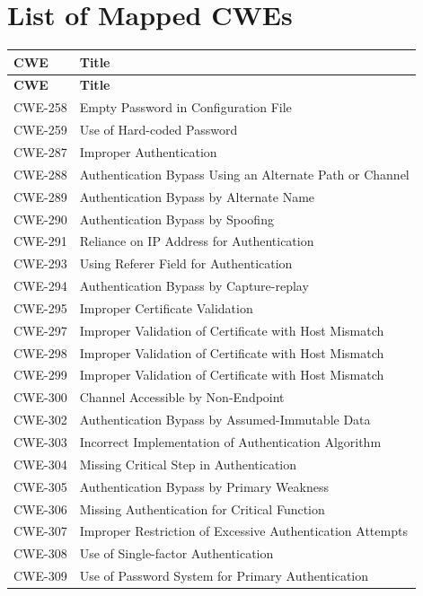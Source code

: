 \documentclass[11pt]{article}
\begin{document}
\section{List of Mapped CWEs}
\renewcommand{\arraystretch}{1.1}
\begin{longtable}{@{}p{2.4cm}p{12.0cm}@{}}
\toprule
\textbf{CWE} & \textbf{Title} \\
\midrule
\endfirsthead
\toprule
\textbf{CWE} & \textbf{Title} \\
\midrule
\endhead
\bottomrule
\endfoot

CWE-258  & Empty Password in Configuration File \\
CWE-259  & Use of Hard-coded Password \\
CWE-287  & Improper Authentication \\
CWE-288  & Authentication Bypass Using an Alternate Path or Channel \\
CWE-289  & Authentication Bypass by Alternate Name \\
CWE-290  & Authentication Bypass by Spoofing \\
CWE-291  & Reliance on IP Address for Authentication \\
CWE-293  & Using Referer Field for Authentication \\
CWE-294  & Authentication Bypass by Capture-replay \\
CWE-295  & Improper Certificate Validation \\
CWE-297  & Improper Validation of Certificate with Host Mismatch \\
CWE-298  & Improper Validation of Certificate with Host Mismatch \\
CWE-299  & Improper Validation of Certificate with Host Mismatch \\
CWE-300  & Channel Accessible by Non-Endpoint \\
CWE-302  & Authentication Bypass by Assumed-Immutable Data \\
CWE-303  & Incorrect Implementation of Authentication Algorithm \\
CWE-304  & Missing Critical Step in Authentication \\
CWE-305  & Authentication Bypass by Primary Weakness \\
CWE-306  & Missing Authentication for Critical Function \\
CWE-307  & Improper Restriction of Excessive Authentication Attempts \\
CWE-308  & Use of Single-factor Authentication \\
CWE-309  & Use of Password System for Primary Authentication \\

\end{longtable}
\end{document}
